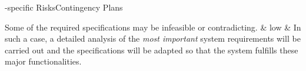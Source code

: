{\vspace{1cm}

\begin{RiskTable}{\WPSpecification-specific Risks}{Contingency Plans}

Some of the required specifications may be infeasible or contradicting. & low & In such a case, a detailed analysis of the \emph{most important} system requirements will be carried out and the specifications will be adapted so that the system fulfills these major functionalities.
\end{RiskTable}
}

